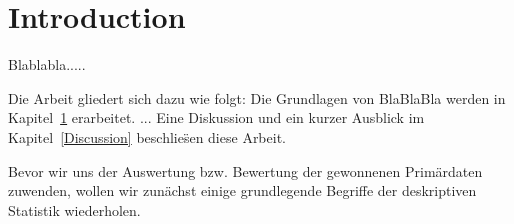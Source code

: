 
\chapter{Introduction}
\label{Introduction}

Blablabla.....

\medskip
Die Arbeit gliedert sich dazu wie folgt: Die Grundlagen von BlaBlaBla 
werden in Kapitel~\ref{Introduction} erarbeitet. 
...
Eine
Diskussion und ein kurzer Ausblick im
Kapitel~\ref{Discussion} beschlie\"sen diese Arbeit.

Bevor wir uns der Auswertung bzw. Bewertung der gewonnenen Prim\"ardaten zuwenden, wollen wir zun\"achst einige grundlegende Begriffe der deskriptiven Statistik wiederholen.

